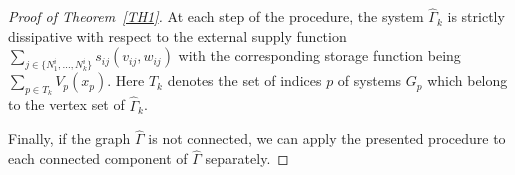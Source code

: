 \documentclass[11pt,a4paper,oneside,DIV=12,headings=small]{scrartcl}
\theoremstyle{plain}
\begin{document}
\begin{proof}[Proof of Theorem~\ref{TH1}]
At each step of the procedure, the system $\hat \Gamma_k$ is strictly dissipative with respect to the external supply function $\sum_{j\in \{N_1^i, \ldots, N_{k}^i\}}s_{ij}(v_{ij},w_{ij})$ with the corresponding storage function being $\sum_{p \in T_{k}} V_p(x_p)$. Here $T_{k}$ denotes the set of indices $p$ of systems $G_p$ which belong to the vertex set of $\hat{\Gamma}_{k}$. 

Finally, if the graph $\hat{\Gamma}$ is not connected, we can apply the presented procedure to each connected component of $\hat{\Gamma}$ separately.  
\end{proof}
\end{document}
